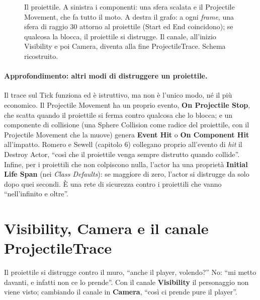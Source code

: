 \begin{figure}[htbp]
\caption{Il proiettile. A sinistra i componenti: una sfera scalata e il Projectile
Movement, che fa tutto il moto. A destra il grafo: a ogni \emph{frame}, una sfera di
raggio 30 attorno al proiettile (Start ed End coincidono); se qualcosa la blocca, il
proiettile si distrugge. Il canale, all'inizio Visibility e poi Camera, diventa alla
fine ProjectileTrace. Schema ricostruito.}
\label{ue5:fig:proiettile}
\end{figure}

\paragraph{Approfondimento: altri modi di distruggere un proiettile.} Il trace sul Tick
funziona ed è istruttivo, ma non è l'unico modo, né il più economico. Il Projectile
Movement ha un proprio evento, \textbf{On Projectile Stop}, che scatta quando il
proiettile si ferma contro qualcosa che lo blocca; e un componente di collisione (una
Sphere Collision come radice del proiettile, con il Projectile Movement che la muove)
genera \textbf{Event Hit} o \textbf{On Component Hit} all'impatto. Romero e Sewell
(capitolo 6) collegano proprio all'evento di \emph{hit} il Destroy Actor, ``così che il
proiettile venga sempre distrutto quando collide''. Infine, per i proiettili che non
colpiscono nulla, l'actor ha una proprietà \textbf{Initial Life Span} (nei \emph{Class
Defaults}): se maggiore di zero, l'actor si distrugge da solo dopo quei secondi. È una
rete di sicurezza contro i proiettili che vanno ``nell'infinito e oltre''.

\section{Visibility, Camera e il canale ProjectileTrace}
\label{ue5:sec:projtrace}

Il proiettile si distrugge contro il muro, ``anche il player, volendo?'' No: ``mi metto
davanti, e infatti non ce lo prende''. Con il canale \textbf{Visibility} il personaggio
non viene visto; cambiando il canale in \textbf{Camera}, ``così ci prende pure il
player''.

